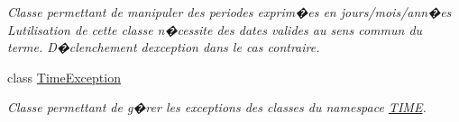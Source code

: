 \begin{DoxyCompactItemize}
\begin{DoxyCompactList}\small\item\em Classe permettant de manipuler des periodes exprim�es en jours/mois/ann�es L\textquotesingle{}utilisation de cette classe n�cessite des dates valides au sens commun du terme. D�clenchement d\textquotesingle{}exception dans le cas contraire. \end{DoxyCompactList}\item 
class \hyperlink{class_t_i_m_e_1_1_time_exception}{Time\+Exception}
\begin{DoxyCompactList}\small\item\em Classe permettant de g�rer les exceptions des classes du namespace \hyperlink{namespace_t_i_m_e}{T\+I\+M\+E}. \end{DoxyCompactList}\end{DoxyCompactItemize}
